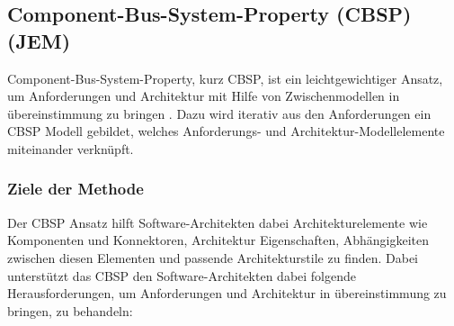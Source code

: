 \subsection{Component-Bus-System-Property (CBSP) (JEM)}\label{cbsp}
Component-Bus-System-Property, kurz CBSP, ist ein leichtgewichtiger Ansatz, um Anforderungen und Architektur mit Hilfe von Zwischenmodellen in \"ubereinstimmung zu bringen \cite{Gru01}. Dazu wird iterativ aus den Anforderungen ein CBSP Modell gebildet, welches Anforderungs- und Architektur-Modellelemente miteinander verkn\"upft. \\

\subsubsection{Ziele der Methode}

Der CBSP Ansatz hilft Software-Architekten dabei Architekturelemente wie Komponenten und Konnektoren, Architektur Eigenschaften, Abh\"angigkeiten zwischen diesen Elementen und passende Architekturstile zu finden. Dabei unterst\"utzt das CBSP den Software-Architekten dabei folgende Herausforderungen, um Anforderungen und Architektur in \"ubereinstimmung zu bringen, zu behandeln: \\


